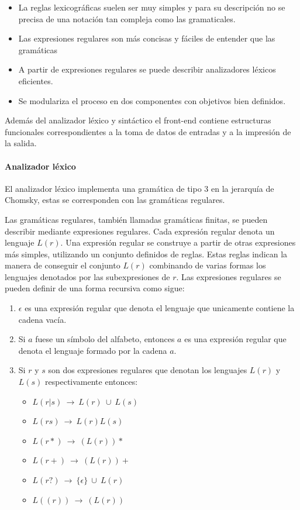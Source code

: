 \begin{itemize}
\item La reglas lexicográficas suelen ser muy simples y para su descripción no se precisa de una 
notación tan compleja como las gramaticales.
\item Las expresiones regulares son más concisas y fáciles de entender que las gramáticas
\item A partir de expresiones regulares se puede describir analizadores léxicos eficientes.
\item Se modulariza el proceso en dos componentes con objetivos bien definidos. 
\end{itemize}

Además del analizador léxico y sintáctico el front-end contiene estructuras funcionales correspondientes
a la toma de datos de entradas y a la impresión de la salida. 

\paragraph {Analizador léxico}
El analizador léxico implementa una gramática de tipo 3 en la jerarquía de Chomsky, estas
se corresponden con las gramáticas regulares. 

Las gramáticas regulares, también llamadas gramáticas finitas, se pueden describir mediante expresiones regulares. 
Cada expresión regular denota un lenguaje $L(r)$. Una expresión regular se construye a partir de otras expresiones
más simples, utilizando un conjunto definidos de reglas. Estas reglas indican la manera de conseguir el conjunto 
$L(r)$ combinando de varias formas los lenguajes denotados por las subexpresiones de $r$. Las expresiones regulares
se pueden definir de una forma recursiva como sigue: 

\begin {enumerate}
\item $\epsilon$ es una expresión regular que denota el lenguaje que unicamente contiene la cadena vacía.
\item Si $a$ fuese un símbolo del alfabeto, entonces $a$ es una expresión regular que denota el lenguaje formado
por la cadena $a$.
\item Si $r$ y $s$ son dos expresiones regulares que denotan los lenguajes $L(r)$ y $L(s)$ respectivamente entonces:
\begin{itemize}
   \item $L(r|s)\ \rightarrow\ L(r)\ \cup\ L(s)$
   \item $L(rs) \ \rightarrow\ L(r)L(s)$
   \item $L(r*)\ \rightarrow\ (L(r))*$
   \item $L(r+)\ \rightarrow\ (L(r))+$
   \item $L(r?)\ \rightarrow\ \{\epsilon\}\ \cup\ L(r)$
   \item $L((r))\ \rightarrow\ (L(r))$
\end{itemize}
\end{enumerate}

